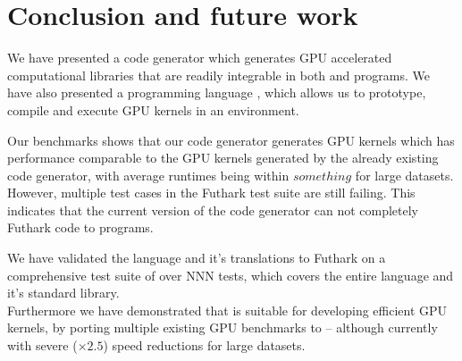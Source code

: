 \chapter{Conclusion and future work}
We have presented a code generator which generates GPU accelerated computational
libraries that are readily integrable in both \csharp{} and \fsharp{} programs.
We have also presented a programming language \fshark{}, which allows us to
prototype, compile and execute GPU kernels in an \fsharp{} environment.

Our benchmarks shows that our \csharp{} code generator generates GPU kernels
which has performance comparable to the GPU kernels generated by the already
existing \C{} code generator, with average runtimes being within $something$ for
large datasets.
However, multiple test cases in the Futhark test suite are still failing. This
indicates that the current version of the \csharp{} code generator can not
completely Futhark code to \csharp{} programs.

We have validated the \fshark{} language and it's translations to Futhark on a
comprehensive test suite of over NNN tests, which covers the entire \fsharp{} language and it's
standard library.\\
Furthermore we have demonstrated that \fshark{} is suitable for
developing efficient GPU kernels, by porting multiple existing GPU benchmarks to
\fshark{} \--- although currently with severe ($\times 2.5$) speed reductions for large datasets.

